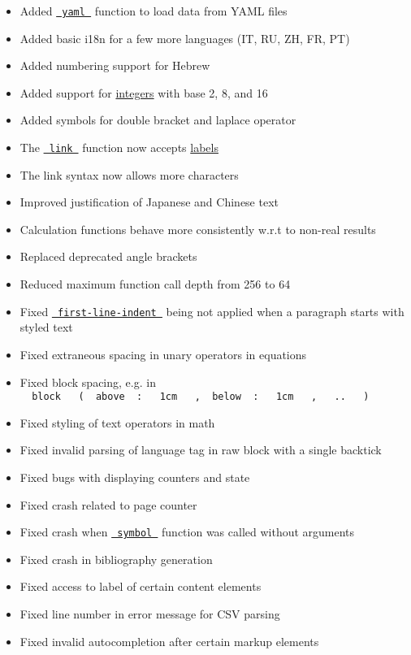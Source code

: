 \begin{itemize}
\tightlist
\item
  Added \href{/docs/reference/data-loading/yaml/}{\texttt{\ yaml\ }}
  function to load data from YAML files
\item
  Added basic i18n for a few more languages (IT, RU, ZH, FR, PT)
\item
  Added numbering support for Hebrew
\item
  Added support for \href{/docs/reference/foundations/int/}{integers}
  with base 2, 8, and 16
\item
  Added symbols for double bracket and laplace operator
\item
  The \href{/docs/reference/model/link/}{\texttt{\ link\ }} function now
  accepts \href{/docs/reference/foundations/label/}{labels}
\item
  The link syntax now allows more characters
\item
  Improved justification of Japanese and Chinese text
\item
  Calculation functions behave more consistently w.r.t to non-real
  results
\item
  Replaced deprecated angle brackets
\item
  Reduced maximum function call depth from 256 to 64
\item
  Fixed
  \href{/docs/reference/model/par/\#parameters-first-line-indent}{\texttt{\ first-line-indent\ }}
  being not applied when a paragraph starts with styled text
\item
  Fixed extraneous spacing in unary operators in equations
\item
  Fixed block spacing, e.g. in
  \texttt{\ }{\texttt{\ block\ }}\texttt{\ }{\texttt{\ (\ }}\texttt{\ above\ }{\texttt{\ :\ }}\texttt{\ }{\texttt{\ 1cm\ }}\texttt{\ }{\texttt{\ ,\ }}\texttt{\ below\ }{\texttt{\ :\ }}\texttt{\ }{\texttt{\ 1cm\ }}\texttt{\ }{\texttt{\ ,\ }}\texttt{\ }{\texttt{\ ..\ }}\texttt{\ }{\texttt{\ )\ }}\texttt{\ }
\item
  Fixed styling of text operators in math
\item
  Fixed invalid parsing of language tag in raw block with a single
  backtick
\item
  Fixed bugs with displaying counters and state
\item
  Fixed crash related to page counter
\item
  Fixed crash when
  \href{/docs/reference/symbols/symbol/}{\texttt{\ symbol\ }} function
  was called without arguments
\item
  Fixed crash in bibliography generation
\item
  Fixed access to label of certain content elements
\item
  Fixed line number in error message for CSV parsing
\item
  Fixed invalid autocompletion after certain markup elements
\end{itemize}

